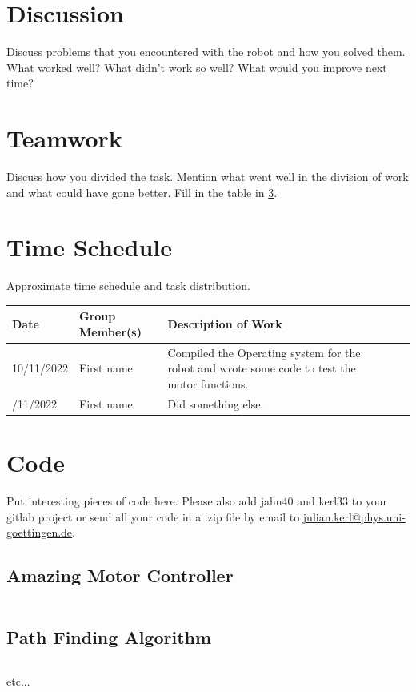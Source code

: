 \documentclass[
	12pt,
]{sty/report_style}
\begin{document}
\section{Discussion}

Discuss problems that you encountered with the robot and how you solved them. What worked well? What didn't work so well? What would you improve next time? 

\section{Teamwork}

Discuss how you divided the task. Mention what went well in the division of work and what could have gone better. Fill in the table in \cref{appendix:time_schedule}.

\clearpage
\appendix
\section{Time Schedule}\label{appendix:time_schedule}

Approximate time schedule and task distribution.

\begin{table}[h]
\begin{tabularx}{\linewidth}{@{}p{2cm}p{4cm}Xc>{\centering\arraybackslash}c@{}}
\toprule
Date                  & Group Member(s)        & Description of Work \\
\midrule
10/11/2022 & First name & Compiled the Operating system for the robot and wrote some code to test the motor functions. \\
\addlinespace[0.5em]
10/11/2022 & First name & Did something else. \\
\bottomrule
\end{tabularx}
\end{table}



\clearpage
\section{Code}\label{appendix:code}

Put interesting pieces of code here. Please also add jahn40 and kerl33 to your gitlab project or send all your code in a .zip file by email to \href{mailto:julian.kerl@phys.uni-goettingen.de}{julian.kerl@phys.uni-goettingen.de}. 

\subsection*{Amazing Motor Controller}
\inputminted{python}{example.py}

\subsection*{Path Finding Algorithm}
\inputminted{python}{example2.py}

etc...
\end{document}
